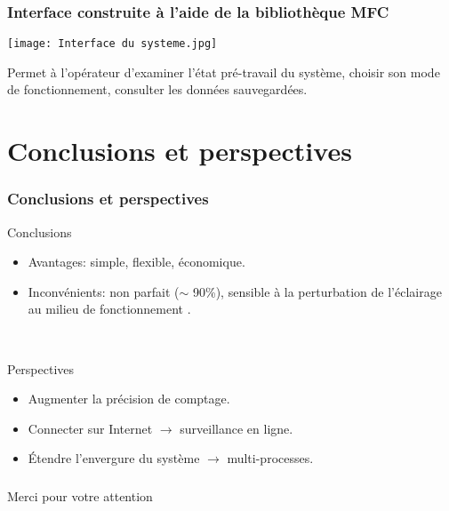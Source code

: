 \documentclass{beamer}
\begin{document}
\begin{frame}
\frametitle{Interface construite à l'aide de la bibliothèque MFC}
\centering
    \texttt{[image: Interface du systeme.jpg]}

Permet à l'opérateur d'examiner l'état pré-travail du système, choisir son mode de fonctionnement, consulter les données sauvegardées.
\end{frame}

\section{Conclusions et perspectives}

\begin{frame}
\frametitle{Conclusions et perspectives}

\begin{exampleblock}{\Large{Conclusions}}
	\begin{itemize}
		\item Avantages: simple, flexible, économique. 
		\item Inconvénients: non parfait ($\sim$ 90\%), sensible à la  perturbation de l'éclairage au milieu de fonctionnement . 
	\end{itemize}
\end{exampleblock}
\
\begin{exampleblock}{\Large{Perspectives}}
	\begin{itemize}
		\item Augmenter la précision de comptage. 
		\item Connecter sur Internet $\longrightarrow$ surveillance en ligne.
 	    \item Étendre l’envergure du système $\longrightarrow$ multi-processes. 
	\end{itemize}
\end{exampleblock}

\end{frame}

\begin{frame}
\frametitle{}
\Huge{\centerline{Merci pour votre attention}}
\end{frame}

\end{document}
